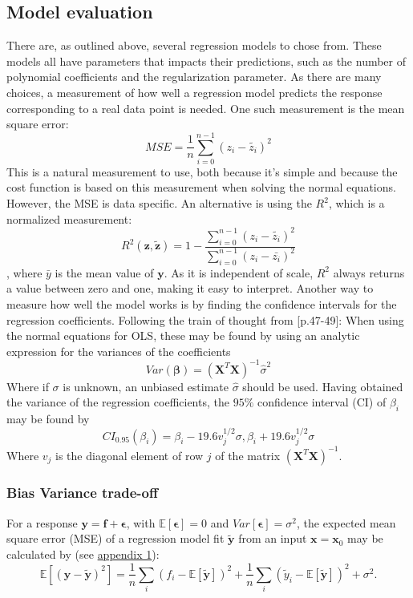 \documentclass[%
oneside,                 %
final,                   %
10pt]{article}
\begin{document}
\subsection{Model evaluation} 
There are, as outlined above, several regression models to chose from. These models all have parameters that impacts their predictions, such as the number of polynomial coefficients and the regularization parameter. As there are many choices, a measurement of how well a regression model predicts the response corresponding to a real data point is needed. One such measurement is the mean square error:
\begin{equation}
MSE=\displaystyle \frac{1}{n}\sum_{i=0}^{n-1} (z_i - \tilde{z_i})^2 
\end{equation}
This is a natural measurement to use, both because it's simple and because the cost function is based on this measurement when solving the normal equations. However, the MSE is data specific. An alternative is using the $R^2$, which is a normalized measurement:
\begin{equation}
R^2(\bm{z},\bm{\tilde{z}})=1-\frac{\sum_{i=0}^{n-1} (z_i - \tilde{z_i})^2 }{\sum_{i=0}^{n-1} (z_i - \bar{z_i})^2 }
\end{equation}
, where $\bar{y}$ is the mean value of $\bm{y}$. As it is independent of scale, $R^2$ always returns a value between zero and one, making it easy to interpret. \newline
Another way to measure how well the model works is by finding the confidence intervals for the regression coefficients. Following the train of thought from \citep{HastieTrevor2009TEoS}[p.47-49]: When using the normal equations for OLS, these may be found by using an analytic expression for the variances of the coefficients
\begin{equation}
Var(\bm{\beta})=(\bm{X}^T\bm{X})^{-1}\hat{\sigma}^2
\end{equation}
Where if $\sigma$ is unknown, an unbiased estimate $\hat{\sigma}$ should be used. Having obtained the variance of the regression coefficients, the $95\% $ confidence interval (CI) of $\beta_i$ may be found by 
\begin{equation}
CI_{0.95}(\beta_i)=\beta_i-19.6 v_j^{1/2}\sigma,\beta_i+19.6 v_j^{1/2}\sigma
\label{eq:M_conf_beta}
\end{equation}
Where $v_j$ is the diagonal element of row $j$ of the matrix $(\bm{X}^T\bm{X})^{-1}$.


\subsubsection{Bias Variance trade-off}
\label{S:M_Biasvar}
For a response $\bm{y}=\bm{f}+\bm{\epsilon}$, with $\mathbb{E}[{\bm{\epsilon}}]=0$ and $Var[\bm{\epsilon}]=\sigma^2$, the expected mean square error (MSE) of a regression model fit $\bm{\tilde{y}}$ from an input $\bm{x}=\bm{x}_0$ may be calculated by (see \hyperref[APP_1]{appendix 1}):
\begin{equation}
\mathbb{E}\left[(\bm{y}-\bm{\tilde{y}})^2\right]=\frac{1}{n}\sum_i(f_i-\mathbb{E}\left[\bm{\tilde{y}}\right])^2+\frac{1}{n}\sum_i(\tilde{y}_i-\mathbb{E}\left[\bm{\tilde{y}}\right])^2+\sigma^2.
\end{equation}
\end{document}
